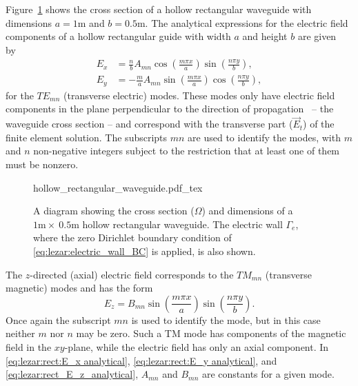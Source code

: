 Figure~\ref{fig:lezar:hollow_rectangular_guide} shows the cross
section of a hollow rectangular waveguide with dimensions
$a = 1\text{m}$ and $b = 0.5\text{m}$.
The analytical expressions for the electric field
components of a hollow rectangular guide with width $a$ and height $b$
are given by~\citep{Pozar2005}
\begin{align}
    \label{eq:lezar:rect:E_x analytical}
    E_x &= \frac{n}{b}A_{mn}\cos\left(\frac{m\pi
    x}{a}\right)\sin\left(\frac{n\pi y}{b}\right),\\
    \label{eq:lezar:rect:E_y analytical}
    E_y &= -\frac{m}{a}A_{mn}\sin\left(\frac{m\pi x}{a}\right)\cos\left(\frac{n\pi y}{b}\right),
\end{align}
for the $TE_{mn}$ (transverse electric) modes. These modes only have
electric field components in the plane perpendicular to the direction of propagation~\citep{Pozar2005} -- the waveguide cross section -- and
correspond with the transverse part ($\vec{E}_t$) of the finite
element solution. The subscripts $mn$ are used to identify the modes,
with $m$ and $n$ non-negative integers subject to the restriction that
at least one of them must be nonzero.

\begin{figure}
    \centering
    \def\svgwidth{\smallfig}
    {hollow_rectangular_waveguide.pdf_tex}
    \caption{A diagram showing the cross section ($\Omega$) and dimensions
    of a $1\text{m}\times~0.5\text{m}$ hollow rectangular waveguide.
    The electric wall $\Gamma_e$, where the zero Dirichlet
    boundary condition of \eqref{eq:lezar:electric_wall_BC} is applied, is also shown.}
    \label{fig:lezar:hollow_rectangular_guide}
\end{figure}

The $z$-directed (axial) electric field corresponds to the $TM_{mn}$
(transverse magnetic) modes and has the form~\citep{Pozar2005}
\begin{equation}
 \label{eq:lezar:rect_E_z_analytical}
 E_z = B_{mn}\sin\left(\frac{m\pi x}{a}\right)\sin\left(\frac{n\pi y}{b}\right).
\end{equation}
Once again the subscript $mn$ is used to identify the mode, but in
this case neither $m$ nor $n$ may be zero. Such a TM mode has
components of the magnetic field in the $xy$-plane, while the electric
field has only an axial component. In \eqref{eq:lezar:rect:E_x
analytical}, \eqref{eq:lezar:rect:E_y analytical},
and \eqref{eq:lezar:rect_E_z_analytical}, $A_{mn}$ and $B_{mn}$ are
constants for a given mode.


